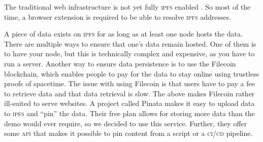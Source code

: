 The traditional web infrastructure is not yet fully \textsc{ipfs} enabled%
%
.
So most of the time, a browser extension is required to be able to resolve \textsc{ipfs} addresses.

A piece of data exists on \textsc{ipfs} for as long as at least one node hosts the data.
There are multiple ways to ensure that one's data remain hosted.
One of them is to have your node, but this is technically complex and expensive, as you have to run a server.
%
Another way to ensure data persistence is to use the Filecoin blockchain, which enables people to pay for the data to stay online using trustless proofs of spacetime.
The issue with using Filecoin is that users have to pay a fee to retrieve data and that data retrieval is slow.
The above makes Filecoin rather ill-suited to serve websites.
\marginElement{}%
A project called Pinata makes it easy to upload data to \textsc{ipfs} and \enquote{pin} the data.
Their free plan allows for storing more data than the demo would ever require, so we decided to use this service.
Further, they offer some \textsc{api} that makes it possible to pin content from a script or a \textsc{ci/cd} pipeline.

